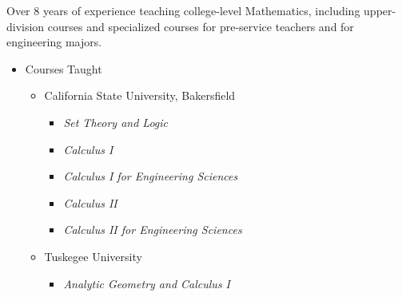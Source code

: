 \documentclass[11pt]{article}
\begin{document}
\newpage

  Over 8 years of experience teaching college-level Mathematics,
  including upper-division courses
  and specialized courses for pre-service teachers
  and for engineering majors.
  \begin{itemize}
    \item{} Courses Taught
    \begin{itemize}
      \item{} California State University, Bakersfield
      \begin{itemize}
        \item{} \emph{Set Theory and Logic}
        \item{} \emph{Calculus I}
        \item{} \emph{Calculus I for Engineering Sciences}
        \item{} \emph{Calculus II}
        \item{} \emph{Calculus II for Engineering Sciences}
      \end{itemize}
      \item{} Tuskegee University
      \begin{itemize}
        \item{} \emph{Analytic Geometry and Calculus I}

\end{itemize}
\end{itemize}
\end{itemize}
\end{document}
